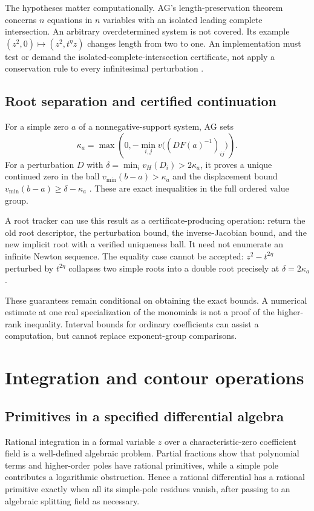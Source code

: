 \documentclass[11pt,letterpaper]{article}
\theoremstyle{definition}\newtheorem{definition}[theorem]{Definition}
\theoremstyle{remark}\newtheorem{remark}[theorem]{Remark}
\numberwithin{equation}{section}\setcounter{tocdepth}{2}
\begin{document}
The hypotheses matter computationally. AG's length-preservation theorem concerns $n$ equations in $n$ variables with an isolated leading complete intersection. An arbitrary overdetermined system is not covered. Its example $(z^2,0)\mapsto(z^2,t^\eta z)$ changes length from two to one. An implementation must test or demand the isolated-complete-intersection certificate, not apply a conservation rule to every infinitesimal perturbation \cite{AG}.

\subsection{Root separation and certified continuation}
For a simple zero $a$ of a nonnegative-support system, AG sets
\[
 \kappa_a=\max\left(0,-\min_{i,j}v\bigl((DF(a)^{-1})_{ij}\bigr)\right).
\]
For a perturbation $D$ with $\delta=\min_i v_H(D_i)>2\kappa_a$, it proves a unique continued zero in the ball $v_{\min}(b-a)>\kappa_a$ and the displacement bound $v_{\min}(b-a)\ge\delta-\kappa_a$ \cite{AG}. These are exact inequalities in the full ordered value group.

A root tracker can use this result as a certificate-producing operation: return the old root descriptor, the perturbation bound, the inverse-Jacobian bound, and the new implicit root with a verified uniqueness ball. It need not enumerate an infinite Newton sequence. The equality case cannot be accepted: $z^2-t^{2\eta}$ perturbed by $t^{2\eta}$ collapses two simple roots into a double root precisely at $\delta=2\kappa_a$.

These guarantees remain conditional on obtaining the exact bounds. A numerical estimate at one real specialization of the monomials is not a proof of the higher-rank inequality. Interval bounds for ordinary coefficients can assist a computation, but cannot replace exponent-group comparisons.

\section{Integration and contour operations}\label{sec:integration}
\subsection{Primitives in a specified differential algebra}
Rational integration in a formal variable $z$ over a characteristic-zero coefficient field is a well-defined algebraic problem. Partial fractions show that polynomial terms and higher-order poles have rational primitives, while a simple pole contributes a logarithmic obstruction. Hence a rational differential has a rational primitive exactly when all its simple-pole residues vanish, after passing to an algebraic splitting field as necessary.
\end{document}
